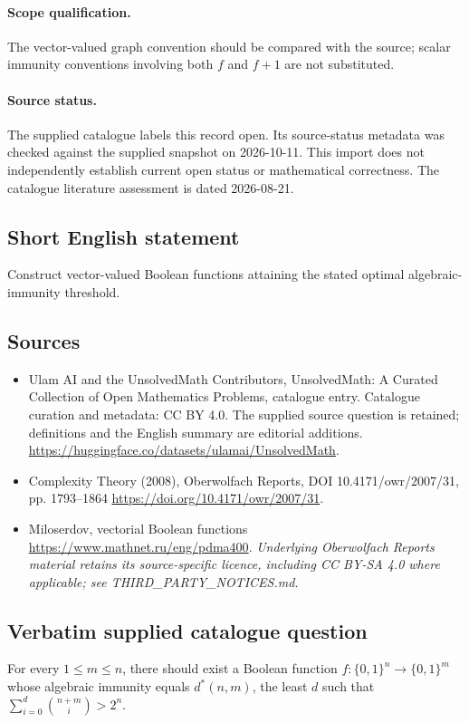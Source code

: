 \documentclass[11pt]{article}
\begin{document}
\paragraph{Scope qualification.}
The vector-valued graph convention should be compared with the source; scalar immunity conventions involving both $f$ and $f+1$ are not substituted.
\paragraph{Source status.}
The supplied catalogue labels this record open. Its source-status metadata was checked against the supplied snapshot on 2026-10-11. This import does not independently establish current open status or mathematical correctness. The catalogue literature assessment is dated 2026-08-21.
\subsection{Short English statement}
Construct vector-valued Boolean functions attaining the stated optimal algebraic-immunity threshold.
\subsection{Sources}
\begin{itemize}
\item[S1] Ulam AI and the UnsolvedMath Contributors, UnsolvedMath: A Curated Collection of Open Mathematics Problems, catalogue entry. Catalogue curation and metadata: CC BY 4.0. The supplied source question is retained; definitions and the English summary are editorial additions.
\url{https://huggingface.co/datasets/ulamai/UnsolvedMath}.
\item[S2] Complexity Theory (2008), Oberwolfach Reports, DOI 10.4171/owr/2007/31, pp. 1793--1864
\url{https://doi.org/10.4171/owr/2007/31}.
\item[S3] Miloserdov, vectorial Boolean functions
\url{https://www.mathnet.ru/eng/pdma400}.
\textit{Underlying Oberwolfach Reports material retains its source-specific licence, including CC BY-SA 4.0 where applicable; see THIRD\_PARTY\_NOTICES.md.}
\end{itemize}
\subsection{Verbatim supplied catalogue question}
For every $1\leq m\leq n$, there should exist a Boolean function $f:\{0,1\}^n\to\{0,1\}^m$ whose algebraic immunity equals $d^*(n,m)$, the least $d$ such that $\sum_{i=0}^d\binom{n+m}{i}>2^n$.
\end{document}
